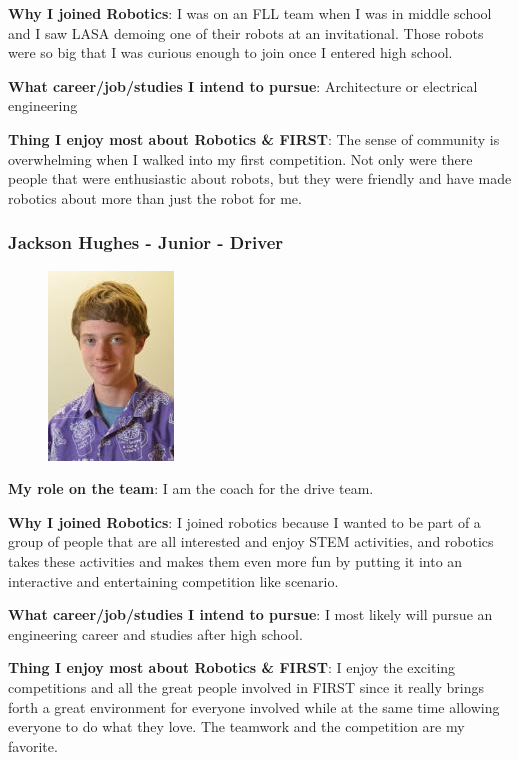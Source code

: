 {\bf Why I joined Robotics}: I was on an FLL team when I was in middle school and I saw LASA demoing one of their robots at an invitational. Those robots were so big that I was curious enough to join once I entered high school.

{\bf What career/job/studies I intend to pursue}: Architecture or electrical engineering

{\bf Thing I enjoy most about Robotics \& FIRST}: The sense of community is overwhelming when I walked into my first competition. Not only were there people that were enthusiastic about robots, but they were friendly and have made robotics about more than just the robot for me. 

\subsubsection{Jackson Hughes - Junior - Driver} 
\begin{figure}[H]
	\includegraphics[width=0.2\linewidth]{jackson}
\end{figure}
{\bf My role on the team}: I am the coach for the drive team.

{\bf Why I joined Robotics}: I joined robotics because I wanted to be part of a group of people that are all interested and enjoy STEM activities, and robotics takes these activities and makes them even more fun by putting it into an interactive and entertaining competition like scenario.

{\bf What career/job/studies I intend to pursue}: I most likely will pursue an engineering career and studies after high school. 

{\bf Thing I enjoy most about Robotics \& FIRST}: I enjoy the exciting competitions and all the great people involved in FIRST since it really brings forth a great environment for everyone involved while at the same time allowing everyone to do what they love.  The teamwork and the competition are my favorite.  

